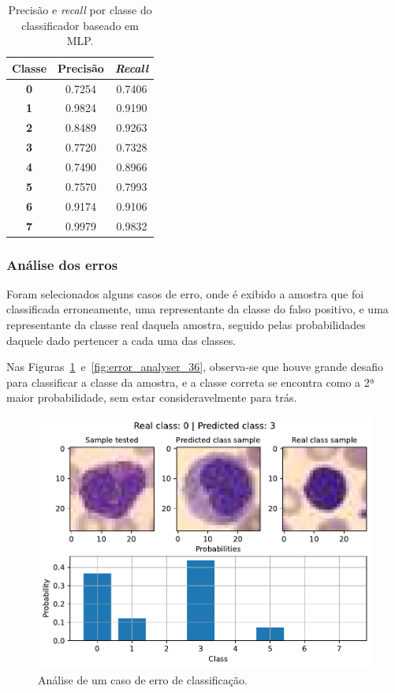\begin{table}[H]
\centering
\begin{tabular}{c|c|c}
	\textbf{Classe} & \textbf{Precisão} & \textit{\textbf{Recall}} \\ \hline
	\textbf{0}     & 0.7254            & 0.7406                   \\
	\textbf{1}     & 0.9824            & 0.9190                   \\
	\textbf{2}     & 0.8489            & 0.9263                   \\
	\textbf{3}     & 0.7720            & 0.7328                   \\
	\textbf{4}     & 0.7490            & 0.8966                   \\
	\textbf{5}     & 0.7570            & 0.7993                   \\
	\textbf{6}     & 0.9174            & 0.9106                   \\
	\textbf{7}     & 0.9979            & 0.9832                  
\end{tabular}
\caption{Precisão e \textit{recall} por classe do classificador baseado em MLP.}
\label{tab:pr_MLP}
\end{table}

\subsubsection{Análise dos erros}

Foram selecionados alguns casos de erro, onde é exibido a amostra que foi classificada erroneamente, uma representante da classe do falso positivo, e uma representante da classe real daquela amostra, seguido pelas probabilidades daquele dado pertencer a cada uma das classes.

Nas Figuras~\ref{fig:error_analyser_88}~e~\ref{fig:error_analyser_36}, observa-se que houve grande desafio para classificar a classe da amostra, e a classe correta se encontra como a 2ª maior probabilidade, sem estar consideravelmente para trás.

\begin{figure}[H]
\centering
\includegraphics[width=0.75\linewidth]{../../plot/mlp/error_analyser_88}
\caption{Análise de um caso de erro de classificação.}
\label{fig:error_analyser_88}
\end{figure}

